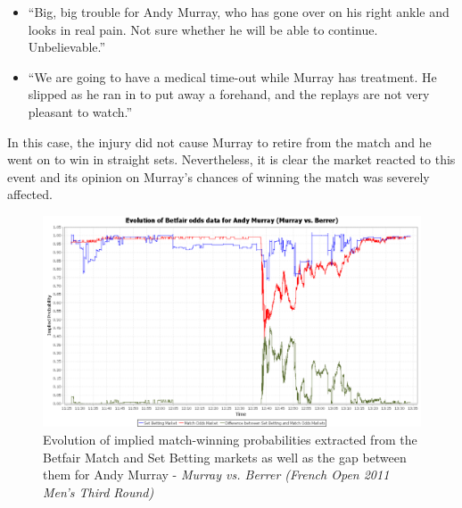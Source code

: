 \documentclass[letterpaper,12pt]{article}
\begin{document}
\begin{itemize}
	\item ``Big, big trouble for Andy Murray, who has gone over on his right ankle and looks in real pain. Not sure whether he will be able to continue. Unbelievable.''
	\item ``We are going to have a medical time-out while Murray has treatment. He slipped as he ran in to put away a forehand, and the replays are not very pleasant to watch.''
\end{itemize}

In this case, the injury did not cause Murray to retire from the match and he went on to win in straight sets.  Nevertheless, it is clear the market reacted to this event and its opinion on Murray's chances of winning the match was severely affected.

\begin{figure}[h!]
  \centering \includegraphics[width=12.5cm]{matches/murrayberrer}
  \caption{Evolution of implied match-winning probabilities extracted from the Betfair Match and Set Betting markets as well as the gap between them for Andy Murray - \textit{Murray vs. Berrer (French Open 2011 Men's Third Round)}}
  \label{murrayberrer}
\end{figure}
\end{document}
